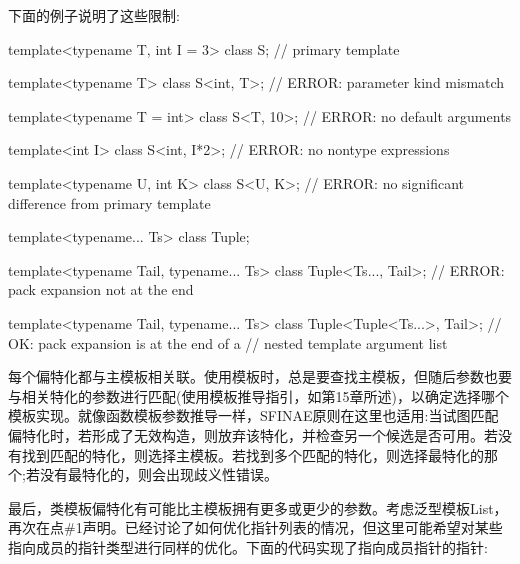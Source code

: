 下面的例子说明了这些限制:

\begin{cpp}
template<typename T, int I = 3>
class S; // primary template

template<typename T>
class S<int, T>; // ERROR: parameter kind mismatch

template<typename T = int>
class S<T, 10>; // ERROR: no default arguments

template<int I>
class S<int, I*2>; // ERROR: no nontype expressions

template<typename U, int K>
class S<U, K>; // ERROR: no significant difference from primary template

template<typename... Ts>
class Tuple;

template<typename Tail, typename... Ts>
class Tuple<Ts..., Tail>; // ERROR: pack expansion not at the end

template<typename Tail, typename... Ts>
class Tuple<Tuple<Ts...>, Tail>; // OK: pack expansion is at the end of a
								// nested template argument list
\end{cpp}

每个偏特化都与主模板相关联。使用模板时，总是要查找主模板，但随后参数也要与相关特化的参数进行匹配(使用模板推导指引，如第15章所述)，以确定选择哪个模板实现。就像函数模板参数推导一样，SFINAE原则在这里也适用:当试图匹配偏特化时，若形成了无效构造，则放弃该特化，并检查另一个候选是否可用。若没有找到匹配的特化，则选择主模板。若找到多个匹配的特化，则选择最特化的那个;若没有最特化的，则会出现歧义性错误。

最后，类模板偏特化有可能比主模板拥有更多或更少的参数。考虑泛型模板List，再次在点\#1声明。已经讨论了如何优化指针列表的情况，但这里可能希望对某些指向成员的指针类型进行同样的优化。下面的代码实现了指向成员指针的指针:


